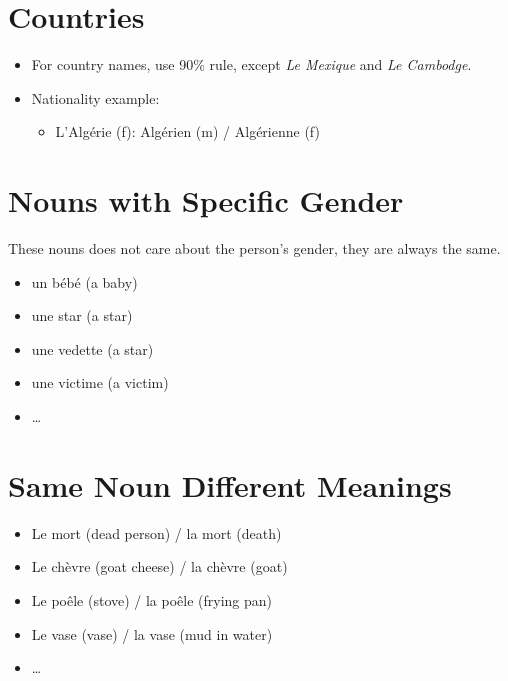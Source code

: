 \documentclass{book}
\begin{document}
    \section{Countries}
        \begin{itemize}
            \item For country names, use 90\% rule, except \textit{Le Mexique} and \textit{Le Cambodge}.
            \item Nationality example:
                \begin{itemize}
                    \item L'Algérie (f): Algérien (m) / Algérienne (f)
                \end{itemize}
        \end{itemize}
        
    \section{Nouns with Specific Gender}
    These nouns does not care about the person's gender, they are always the same.
        \begin{itemize}
            \item un bébé (a baby)
            \item une star (a star)
            \item une vedette (a star)
            \item une victime (a victim)
            \item \dots
        \end{itemize}
    
    \section{Same Noun Different Meanings}
        \begin{itemize}
            \item Le mort (dead person) / la mort (death)
            \item Le chèvre (goat cheese) / la chèvre (goat)
            \item Le poêle (stove) / la poêle (frying pan)
            \item Le vase (vase) / la vase (mud in water)
            \item \dots
        \end{itemize}
    
\end{document}
